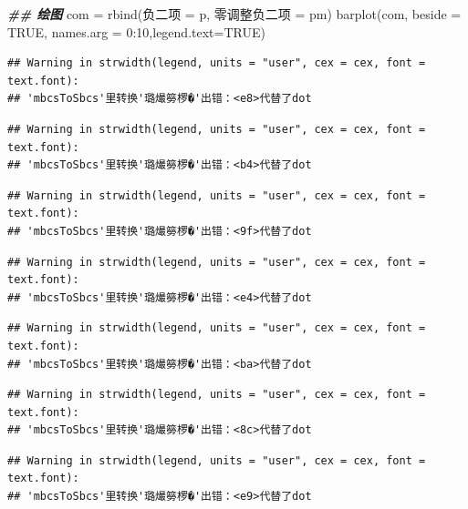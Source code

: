 \documentclass[
]{book}
\newenvironment{Shaded}{\begin{snugshade}}{\end{snugshade}}
\newcommand{\AttributeTok}[1]{\textcolor[rgb]{0.77,0.63,0.00}{#1}}
\newcommand{\ConstantTok}[1]{\textcolor[rgb]{0.00,0.00,0.00}{#1}}
\newcommand{\DecValTok}[1]{\textcolor[rgb]{0.00,0.00,0.81}{#1}}
\newcommand{\DocumentationTok}[1]{\textcolor[rgb]{0.56,0.35,0.01}{\textbf{\textit{#1}}}}
\newcommand{\FunctionTok}[1]{\textcolor[rgb]{0.00,0.00,0.00}{#1}}
\newcommand{\NormalTok}[1]{#1}
\newcommand{\OtherTok}[1]{\textcolor[rgb]{0.56,0.35,0.01}{#1}}
\newcommand{\SpecialCharTok}[1]{\textcolor[rgb]{0.00,0.00,0.00}{#1}}
\begin{document}
\begin{Shaded}
\begin{Highlighting}[]
\DocumentationTok{\#\# 绘图}
\NormalTok{com }\OtherTok{=} \FunctionTok{rbind}\NormalTok{(负二项 }\OtherTok{=}\NormalTok{ p, 零调整负二项 }\OtherTok{=}\NormalTok{ pm)}
\FunctionTok{barplot}\NormalTok{(com, }\AttributeTok{beside =} \ConstantTok{TRUE}\NormalTok{, }\AttributeTok{names.arg =} \DecValTok{0}\SpecialCharTok{:}\DecValTok{10}\NormalTok{,}\AttributeTok{legend.text=}\ConstantTok{TRUE}\NormalTok{)}
\end{Highlighting}
\end{Shaded}

\begin{verbatim}
## Warning in strwidth(legend, units = "user", cex = cex, font = text.font):
## 'mbcsToSbcs'里转换'璐熶簩椤�'出错：<e8>代替了dot
\end{verbatim}

\begin{verbatim}
## Warning in strwidth(legend, units = "user", cex = cex, font = text.font):
## 'mbcsToSbcs'里转换'璐熶簩椤�'出错：<b4>代替了dot
\end{verbatim}

\begin{verbatim}
## Warning in strwidth(legend, units = "user", cex = cex, font = text.font):
## 'mbcsToSbcs'里转换'璐熶簩椤�'出错：<9f>代替了dot
\end{verbatim}

\begin{verbatim}
## Warning in strwidth(legend, units = "user", cex = cex, font = text.font):
## 'mbcsToSbcs'里转换'璐熶簩椤�'出错：<e4>代替了dot
\end{verbatim}

\begin{verbatim}
## Warning in strwidth(legend, units = "user", cex = cex, font = text.font):
## 'mbcsToSbcs'里转换'璐熶簩椤�'出错：<ba>代替了dot
\end{verbatim}

\begin{verbatim}
## Warning in strwidth(legend, units = "user", cex = cex, font = text.font):
## 'mbcsToSbcs'里转换'璐熶簩椤�'出错：<8c>代替了dot
\end{verbatim}

\begin{verbatim}
## Warning in strwidth(legend, units = "user", cex = cex, font = text.font):
## 'mbcsToSbcs'里转换'璐熶簩椤�'出错：<e9>代替了dot
\end{verbatim}
\end{document}
